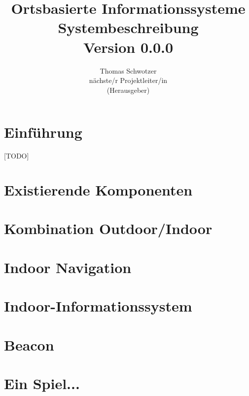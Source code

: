 \documentclass[german]{book}
\begin{document}
\title{Ortsbasierte Informationssysteme\\
Systembeschreibung \\
Version 0.0.0
}

\author{Thomas Schwotzer \\
nächste/r Projektleiter/in\\
(Herausgeber)
}

\maketitle

\tableofcontents

\chapter{Einführung}
[TODO]

\chapter{Existierende Komponenten}

\chapter{Kombination Outdoor/Indoor}


\chapter{Indoor Navigation}
%

\chapter{Indoor-Informationssystem}
%

\chapter{Beacon}


\chapter{Ein Spiel...}
%



\end{document}
